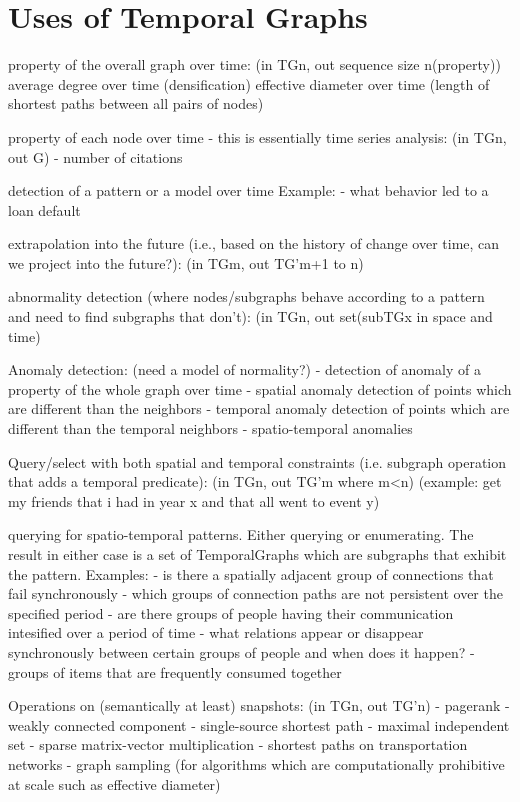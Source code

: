 \section{Uses of Temporal Graphs}

property of the overall graph over time: (in TGn, out sequence size
n(property)) average degree over time (densification) effective
diameter over time (length of shortest paths between all pairs of
nodes)

property of each node over time - this is essentially time series
analysis: (in TGn, out G) - number of citations

detection of a pattern or a model over time
Example:
 - what behavior led to a loan default

extrapolation into the future (i.e., based on the history of change over time, can we project into the future?): (in TGm, out TG'm+1 to n)

abnormality detection (where nodes/subgraphs behave according to a pattern and need to find subgraphs that don't): (in TGn, out set(subTGx in space and time)

Anomaly detection: (need a model of normality?)
- detection of anomaly of a property of the whole graph over time
- spatial anomaly detection of points which are different than the neighbors
- temporal anomaly detection of points which are different than the temporal neighbors
- spatio-temporal anomalies

Query/select with both spatial and temporal constraints (i.e. subgraph operation that adds a temporal predicate): (in TGn, out TG'm where m<n)
 (example: get my friends that i had in year x and that all went to event y)


querying for spatio-temporal patterns. Either querying or enumerating. The result in either case is a set of TemporalGraphs which are subgraphs that exhibit the pattern.
Examples:
 - is there a spatially adjacent group of connections that fail synchronously
 - which groups of connection paths are not persistent over the specified period
 - are there groups of people having their communication intesified over a period of time
 - what relations appear or disappear synchronously between certain groups of people and when does it happen?
 - groups of items that are frequently consumed together

Operations on (semantically at least) snapshots: (in TGn, out TG'n)
 - pagerank
 - weakly connected component
 - single-source shortest path
 - maximal independent set
 - sparse matrix-vector multiplication
 - shortest paths on transportation networks
 - graph sampling (for algorithms which are computationally prohibitive at scale such as effective diameter)

